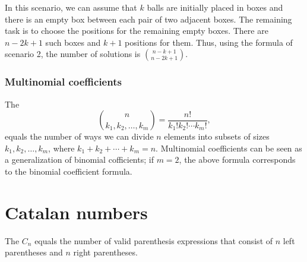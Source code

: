 \begin{center}
\end{center}

In this scenario, we can assume that
$k$ balls are initially placed in boxes
and there is an empty box between each
pair of two adjacent boxes.
The remaining task is to choose the
positions for the remaining empty boxes.
There are $n-2k+1$ such boxes and
$k+1$ positions for them.
Thus, using the formula of scenario 2,
the number of solutions is
${n-k+1 \choose n-2k+1}$.

\subsubsection{Multinomial coefficients}


The 
\[ {n \choose k_1,k_2,\ldots,k_m} = \frac{n!}{k_1! k_2! \cdots k_m!}, \]
equals the number of ways
we can divide $n$ elements into subsets
of sizes $k_1,k_2,\ldots,k_m$,
where $k_1+k_2+\cdots+k_m=n$.
Multinomial coefficients can be seen as a
generalization of binomial cofficients;
if $m=2$, the above formula
corresponds to the binomial coefficient formula.

\section{Catalan numbers}


The 
$C_n$ equals the
number of valid
parenthesis expressions that consist of
$n$ left parentheses and $n$ right parentheses.

